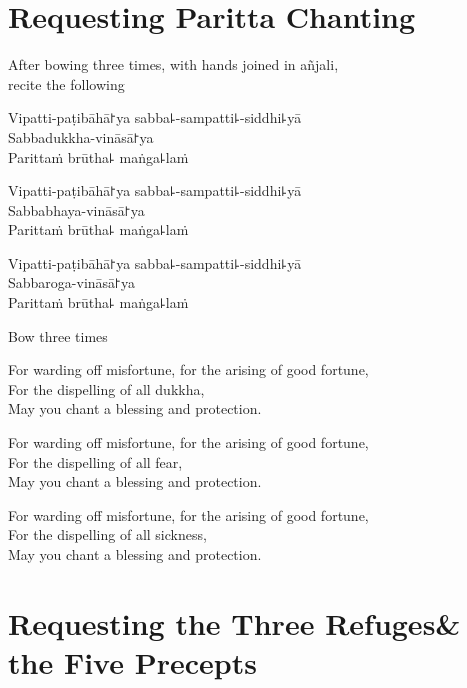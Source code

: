 \clearpage
\chapter{Requesting Paritta Chanting}%

\begin{instruction}
  After bowing three times, with hands joined in añjali,\\
  recite the following
\end{instruction}

Vipatti-paṭibāhā꜓ya sabba꜕-sampatti꜕-siddhi꜕yā\\
Sabbadukkha-vināsā꜓ya\\
Parittaṁ brūtha꜕ maṅga꜕laṁ

Vipatti-paṭibāhā꜓ya sabba꜕-sampatti꜕-siddhi꜕yā\\
Sabbabhaya-vināsā꜓ya\\
Parittaṁ brūtha꜕ maṅga꜕laṁ

Vipatti-paṭibāhā꜓ya sabba꜕-sampatti꜕-siddhi꜕yā\\
Sabbaroga-vināsā꜓ya\\
Parittaṁ brūtha꜕ maṅga꜕laṁ

\begin{instruction}
  Bow three times
\end{instruction}

\begin{english}
For warding off misfortune, for the arising of good fortune,\\
For the dispelling of all dukkha,\\
May you chant a blessing and protection.

For warding off misfortune, for the arising of good fortune,\\
For the dispelling of all fear,\\
May you chant a blessing and protection.

For warding off misfortune, for the arising of good fortune,\\
For the dispelling of all sickness,\\
May you chant a blessing and protection.
\end{english}

\setlength{\englishIndent}{\leaderIndent}

\clearpage
\chapter[Three Refuges \& the Five Precepts]{Requesting the Three Refuges\newline \& the Five Precepts}%

